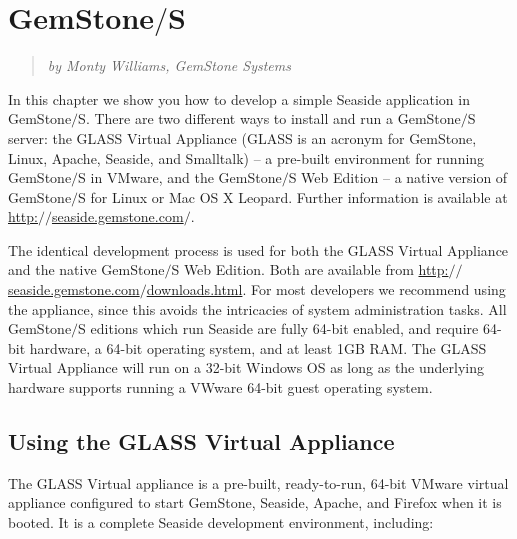 \documentclass[a4paper,10pt,twoside]{book}
\newenvironment{blockquote}%
	{\begin{quote}}
	{\end{quote}}
\begin{document}
\chapter{GemStone$/$S}
\label{book:gettingstarted:gemstone}

\begin{blockquote}
\textit{by Monty Williams, GemStone Systems}

\end{blockquote}

In this chapter we show you how to develop a simple Seaside application in GemStone$/$S. There are two different ways to install and run a GemStone$/$S server: the GLASS Virtual Appliance (GLASS is an acronym for GemStone, Linux, Apache, Seaside, and Smalltalk) -- a pre-built environment for running GemStone$/$S in VMware, and the GemStone$/$S Web Edition -- a native version of GemStone$/$S for Linux or Mac OS X Leopard. Further information is available at \href{http://seaside.gemstone.com/}{http:$/$$/$seaside.gemstone.com$/$}.

The identical development process is used for both the GLASS Virtual Appliance and the native GemStone$/$S Web Edition. Both are available from \href{http://seaside.gemstone.com/downloads.html}{http:$/$$/$seaside.gemstone.com$/$downloads.html}. For most developers we recommend using the appliance, since this avoids the intricacies of system administration tasks. All GemStone$/$S editions which run  Seaside are fully 64-bit enabled, and require 64-bit hardware, a 64-bit operating system, and at least 1GB RAM. The GLASS Virtual Appliance will run on a 32-bit Windows OS as long as the underlying hardware supports running a VWware 64-bit guest operating system.

\section{Using the GLASS Virtual Appliance}
\label{book:gettingstarted:gemstone:usingglassva}

The GLASS Virtual appliance is a pre-built, ready-to-run, 64-bit VMware virtual appliance configured to start GemStone,  Seaside, Apache, and Firefox when it is booted. It is a complete Seaside development environment, including:
\end{document}
